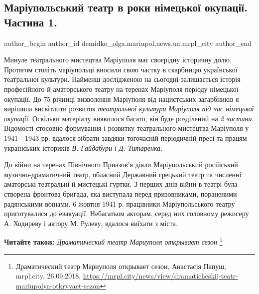  
 
 
 
 
 
\subsection{Маріупольський театр в роки німецької окупації. Частина 1.}
\label{sec:07_10_2018.stz.news.ua.mrpl_city.1.mrpl_teatr_nimecka_okupacia_1}
 
\ifcmt
 author_begin
   author_id demidko_olga.mariupol,news.ua.mrpl_city
 author_end
\fi

Минуле театрального мистецтва Маріуполя має своєрідну історичну долю. Протягом
століть маріупольці вносили свою частку в скарбницю української театральної
культури. Найменш дослідженою на сьогодні залишається історія професійного й
аматорського театру на теренах Маріуполя періоду німецької окупації. До 75
річниці визволення Маріуполя від нацистських загарбників я вирішила висвітлити
розвиток \emph{театральної культури Маріуполя під час німецької окупації}. Оскільки
матеріалу виявилося багато, він буде розділений на \emph{2 частини}. Відомості
стосовно формування і розвитку театрального мистецтва Маріуполя у 1941 - 1943
рр. вдалося зібрати завдяки тогочасній періодичній пресі та працям українських
істориків \emph{В. Гайдабури і Д. Титаренка}.

До війни на теренах Північного Приазов'я діяли Маріупольський російський
музично-драматичний театр, обласний Державний грецький театр та численні
аматорські театральні й мистецькі гуртки. З перших днів війни в театрі була
створена фронтова бригада, яка виступала перед призовниками, пораненими
радянськими воїнами. 6 жовтня 1941 р. працівники Маріупольського театру
приготувалися до евакуації. Небагатьом акторам, серед них головному режисеру А.
Ходиреву і актору М. Рулеву, вдалося виїхати з міста.

\textbf{Читайте також:} \emph{Драматический театр Мариуполя открывает сезон}%
\footnote{Драматический театр Мариуполя открывает сезон, Анастасія Папуш, mrpl.city, 26.09.2018, \url{https://mrpl.city/news/view/dramaticheskij-teatr-mariupolya-otkryvaet-sezon}}

